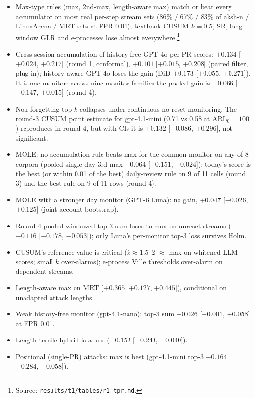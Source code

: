 \documentclass[11pt]{article}
\newcommand{\m}{\ensuremath{-}}
\newcommand{\src}[1]{\footnote{Source: \nolinkurl{#1}.}}
\begin{document}
\begin{itemize}
\item Max-type rules (max, 2nd-max, length-aware max) match or beat every accumulator on most real per-step stream sets (86\% / 67\% / 83\% of aksh-n / LinuxArena / MRT sets at FPR 0.01); textbook CUSUM $k{=}0.5$, SR, long-window GLR and e-processes lose almost everywhere.\src{results/t1/tables/r1_tpr.md}
\item Cross-session accumulation of history-free GPT-4o per-PR scores: $+0.134$ [$+0.024$, $+0.217$] (round 1, conformal), $+0.101$ [$+0.015$, $+0.208$] (paired filter, plug-in); history-aware GPT-4o loses the gain (DiD $+0.173$ [$+0.055$, $+0.271$]). It is one monitor: across nine monitor families the pooled gain is $\m0.066$ [$\m0.147$, $+0.015$] (round 4).
\item Non-forgetting top-$k$ collapses under continuous no-reset monitoring. The round-3 CUSUM point estimate for gpt-4.1-mini (0.71 vs 0.58 at ARL$_0=100$) reproduces in round 4, but with CIs it is $+0.132$ [$\m0.086$, $+0.296$], not significant.
\item MOLE: no accumulation rule beats max for the common monitor on any of 8 corpora (pooled single-day 3rd-max $\m0.064$ [$\m0.151$, $+0.024$]); today's score is the best (or within 0.01 of the best) daily-review rule on 9 of 11 cells (round 3) and the best rule on 9 of 11 rows (round 4).
\item MOLE with a stronger day monitor (GPT-6 Luna): no gain, $+0.047$ [$\m0.026$, $+0.125$] (joint account bootstrap).
\item Round 4 pooled windowed top-3 sum loses to max on unreset streams ($\m0.116$ [$\m0.178$, $\m0.053$]); only Luna's per-monitor top-3 loss survives Holm.
\item CUSUM's reference value is critical ($k\approx1.5$--2 $\approx$ max on whitened LLM scores; small $k$ over-alarms); e-process Ville thresholds over-alarm on dependent streams.
\item Length-aware max on MRT ($+0.365$ [$+0.127$, $+0.445]$), conditional on unadapted attack lengths.
\item Weak history-free monitor (gpt-4.1-nano): top-3 sum $+0.026$ [$+0.001$, $+0.058$] at FPR 0.01.
\item Length-tercile hybrid is a loss ($\m0.152$ [$\m0.243$, $\m0.040$]).
\item Positional (single-PR) attacks: max is best (gpt-4.1-mini top-3 $\m0.164$ [$\m0.284$, $\m0.058$]).
\end{itemize}
\end{document}
